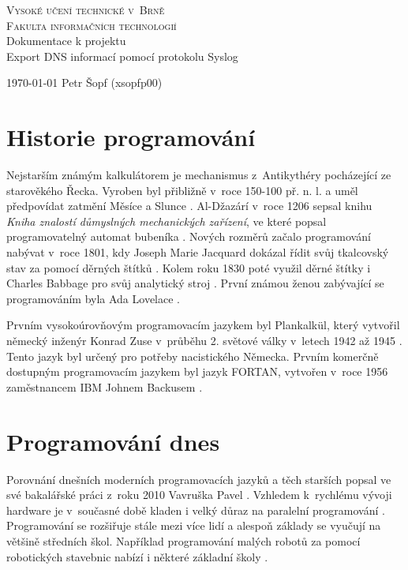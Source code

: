\documentclass[a4paper, 11pt]{article}
\begin{document}
    \begin{titlepage}
        \begin{center}
            \textsc{\Huge Vysoké učení technické v~Brně}\\[0.6em]
            \textsc{\huge Fakulta informačních technologií}\\
            {\LARGE Dokumentace k projektu} \\[0.3em] {\Huge Export DNS informací pomocí protokolu Syslog}\\
        \end{center}
        {\Large \today \hfill
        Petr Šopf (xsopfp00)}
    \end{titlepage}
    
 
\newpage
  \tableofcontents
\newpage

\section{Historie programování}
Nejstarším známým kalkulátorem je mechanismus z~Antikythéry pocházející ze starověkého Řecka. Vyroben byl přibližně v~roce 150-100 př. n. l. a uměl předpovídat zatmění Měsíce a Slunce \cite{Solla:AnAncientGreekComputer}. Al-Džazárí v~roce 1206 sepsal knihu \emph{Kniha znalostí důmyslných mechanických zařízení}, ve které popsal programovatelný automat bubeníka \cite{Dzazari:KnihaZnalostiDumyslnychMechanickychZarizeni}. Nových rozměrů začalo programování nabývat v~roce 1801, kdy Joseph Marie Jacquard dokázal řídit svůj tkalcovský stav za pomocí děrných štítků \cite{Essinger:BirthOfTheInformationAge}. Kolem roku 1830 poté využil děrné štítky i Charles Babbage pro svůj analytický stroj \cite{ThoughtCo:TheFirstComputer}. První známou ženou zabývající se programováním byla Ada Lovelace \cite{Biography:AdaLovelaceBiography}.

Prvním vysokoúrovňovým programovacím jazykem byl Plankalkül, který vytvořil německý inženýr Konrad Zuse v~průběhu 2. světové války v~letech 1942 až 1945 \cite{Bauer:Plankalkul}. Tento jazyk byl určený pro potřeby nacistického Německa. Prvním komerčně dostupným programovacím jazykem byl jazyk FORTAN, vytvořen v~roce 1956 zaměstnancem IBM Johnem Backusem \cite{Wikipedie:Fortan}.

\section{Programování dnes}
Porovnání dnešních moderních programovacích jazyků a těch starších popsal ve své bakalářské práci z~roku 2010 Vavruška Pavel \cite{Thesis:Vavruska}. Vzhledem k~rychlému vývoji hardware je v~současné době kladen i velký důraz na paralelní programování \cite{ComputingInScienceEngineering:Concurrency}. Programování se rozšiřuje stále mezi více lidí a alespoň základy se vyučují na většině středních škol. Například programování malých robotů za pomocí robotických stavebnic nabízí i některé základní školy \cite{Thesis:Fiser}.
\newpage

\end{document}
